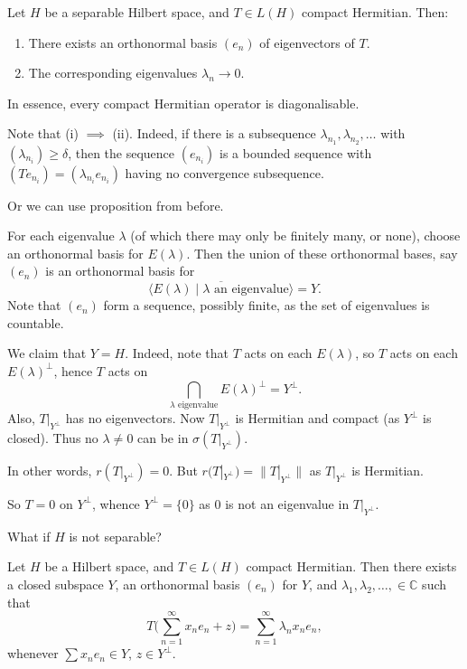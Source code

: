\documentclass[12pt]{article}
\begin{document}
\begin{theorem}
	Let $H$ be a separable Hilbert space, and $T \in L(H)$ compact Hermitian. Then:
	\begin{enumerate}[\normalfont(i)]
		\item There exists an orthonormal basis $(e_n)$ of eigenvectors of $T$.
		\item The corresponding eigenvalues $\lambda_n \to 0$.
	\end{enumerate}
\end{theorem}

In essence, every compact Hermitian operator is diagonalisable.

Note that (i) $\implies$ (ii). Indeed, if there is a subsequence $\lambda_{n_1}, \lambda_{n_2}, \ldots$ with $(\lambda_{n_i}) \geq \delta$, then the sequence $(e_{n_i})$ is a bounded sequence with $(Te_{n_i}) = (\lambda_{n_i} e_{n_i})$ having no convergence subsequence.

Or we can use proposition from before.

\begin{proofbox}
	For each eigenvalue $\lambda$ (of which there may only be finitely many, or none), choose an orthonormal basis for $E(\lambda)$. Then the union of these orthonormal bases, say $(e_n)$ is an orthonormal basis for
	\[
		\overline{\langle E(\lambda) \mid \lambda \text{ an eigenvalue}\rangle} = Y.
	\]
	Note that $(e_n)$ form a sequence, possibly finite, as the set of eigenvalues is countable.

	We claim that $Y = H$. Indeed, note that $T$ acts on each $E(\lambda)$, so $T$ acts on each $E(\lambda)^{\perp}$, hence $T$ acts on
	\[
		\bigcap_{\lambda \text{ eigenvalue}} E(\lambda)^{\perp} = Y^{\perp}.
	\]
	Also, $T|_{Y^{\perp}}$ has no eigenvectors. Now $T|_{Y^{\perp}}$ is Hermitian and compact (as $Y^{\perp}$ is closed). Thus no $\lambda \neq 0$ can be in $\sigma(T|_{Y^{\perp}})$.

	In other words, $r(T|_{Y^{\perp}}) = 0$. But $r(T|_{Y^{\perp}}) = \|T|_{Y^{\perp}}\|$ as $T|_{Y^{\perp}}$ is Hermitian.

	So $T = 0$ on $Y^{\perp}$, whence $Y^{\perp} = \{0\}$ as $0$ is not an eigenvalue in $T|_{Y^{\perp}}$.
\end{proofbox}

What if $H$ is not separable?

\begin{theorem}
	Let $H$ be a Hilbert space, and $T \in L(H)$ compact Hermitian. Then there exists a closed subspace $Y$, an orthonormal basis $(e_n)$ for $Y$, and $\lambda_1, \lambda_2, \ldots, \in \mathbb{C}$ such that
	\[
	T \biggl( \sum_{n = 1}^{\infty} x_n e_n + z \biggr) = \sum_{n = 1}^{\infty} \lambda_n x_n e_n,
	\]
	whenever $\sum x_n e_n \in Y$, $z \in Y^{\perp}$.
\end{theorem}
\end{document}
